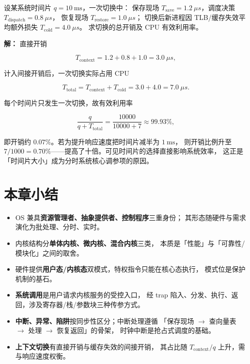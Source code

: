 设某系统时间片 $q = 10\ \mathrm{ms}$，一次切换中：
保存现场 $T_{\text{save}} = 1.2\ \mu s$，调度决策 $T_{\text{dispatch}} = 0.8\ \mu s$，
恢复现场 $T_{\text{restore}} = 1.0\ \mu s$；
切换后新进程因 TLB/缓存失效平均额外损失 $T_{\text{cold}} = 4.0\ \mu s$。
求切换的总开销及 CPU 有效利用率。

\textbf{解：} 直接开销

\begin{equation}
    T_{\text{context}} = 1.2 + 0.8 + 1.0 = 3.0\ \mu s,
\end{equation}

\noindent 计入间接开销后，一次切换实际占用 CPU

\begin{equation}
    T_{\text{total}} = T_{\text{context}} + T_{\text{cold}} = 3.0 + 4.0 = 7.0\ \mu s.
\end{equation}

\noindent 每个时间片只发生一次切换，故有效利用率

\begin{equation}
    \frac{q}{q + T_{\text{total}}} = \frac{10000}{10000 + 7} \approx 99.93\%,
\end{equation}

\noindent 即开销约 $0.07\%$。若为提升响应速度把时间片减半为 $1\ \mathrm{ms}$，
则开销比例升至 $7/1000 = 0.70\%$——提高了十倍。可见时间片的选择直接影响系统效率，
这正是「时间片大小」成为分时系统核心调参项的原因。

\section{本章小结}

\begin{itemize}
    \item OS 兼具\textbf{资源管理者、抽象提供者、控制程序}三重身份；
        其形态随硬件与需求演化为批处理、分时、实时。
    \item 内核结构分\textbf{单体内核、微内核、混合内核}三类，
        本质是「性能」与「可靠性/模块化」之间的取舍。
    \item 硬件提供\textbf{用户态/内核态}双模式，特权指令只能在核心态执行，
        模式位是保护机制的基石。
    \item \textbf{系统调用}是用户请求内核服务的受控入口，
        经 trap 陷入、分发、执行、返回，涉及寄存器/栈/参数块三种传参方式。
    \item \textbf{中断、异常、陷阱}按同步性区分；中断处理遵循
        「保存现场 $\to$ 查向量表 $\to$ 处理 $\to$ 恢复返回」的骨架，
        时钟中断是抢占式调度的基础。
    \item \textbf{上下文切换}有直接开销与缓存失效的间接开销，
        其占比随 $T_{\text{context}}/q$ 上升，需与响应速度权衡。
\end{itemize}

